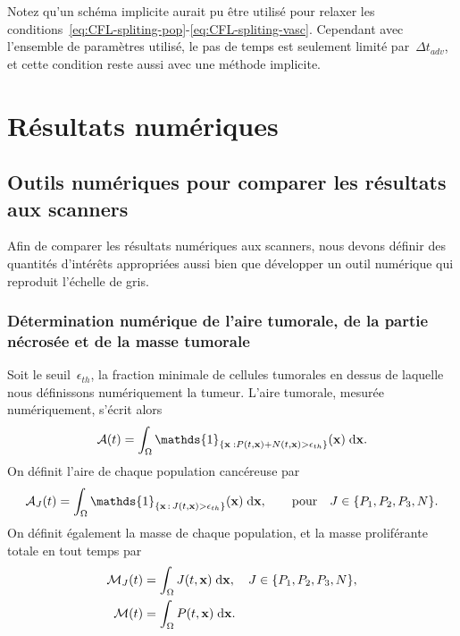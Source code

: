 \documentclass[11pt]{amsart}
\numberwithin{equation}{section}
\newcommand{\vecx}{\mathbf{x}}
\begin{document}
Notez qu'un schéma implicite aurait pu être utilisé pour relaxer les conditions~\eqref{eq:CFL-spliting-pop}-\eqref{eq:CFL-spliting-vasc}. 
Cependant avec l'ensemble de paramètres utilisé, le pas de temps est seulement limité par~$\Delta t_{adv}$, et cette condition reste aussi avec une méthode implicite. 

\section{Résultats numériques}\label{sec:NumRes}

\subsection{Outils numériques pour comparer les résultats aux scanners}

Afin de comparer les résultats numériques aux scanners, nous devons définir des quantités d'intérêts appropriées aussi bien que développer un outil numérique qui reproduit l'échelle de gris. 
\subsubsection{Détermination numérique de l'aire tumorale, de la partie nécrosée et de la masse tumorale}

Soit le seuil~$\epsilon_{th}$, la fraction minimale de cellules tumorales en dessus de laquelle nous définissons numériquement la tumeur. 
L'aire tumorale, mesurée numériquement, s'écrit alors
\begin{equation}
\label{eq:airetot}
\mathcal{A}(t)=\int_\Omega \mathds{1}_{\{\vecx\;: P(t,\vecx)+N(t,\vecx) >\epsilon_{th}\}}(\vecx)\textrm{\;d}\vecx.
\end{equation}
On définit l'aire de chaque population cancéreuse par
\begin{equation}
\mathcal{A}_J(t)=\int_\Omega
\mathds{1}_{\{\vecx\,:\,J(t,\vecx)>\epsilon_{th}\}}(\vecx)\textrm{\;d}\vecx,
\qquad \text{pour}\quad J \in \{P_1,P_2,P_3,N \}.
\label{eq:airepop}
\end{equation}
On définit également la masse de chaque population, et la masse proliférante totale en tout temps par 
\begin{align}
\mathcal{M}_J(t)&=\int_\Omega J(t,\vecx) \textrm{\;d}\vecx, \quad J \in \{P_1,P_2,P_3,N \},
\label{eq:masspop} \\
\mathcal{M}(t)&=\int_\Omega P 
(t,\vecx)\textrm{\;d}\vecx.
\label{eq:masstot}
\end{align}
\end{document}
